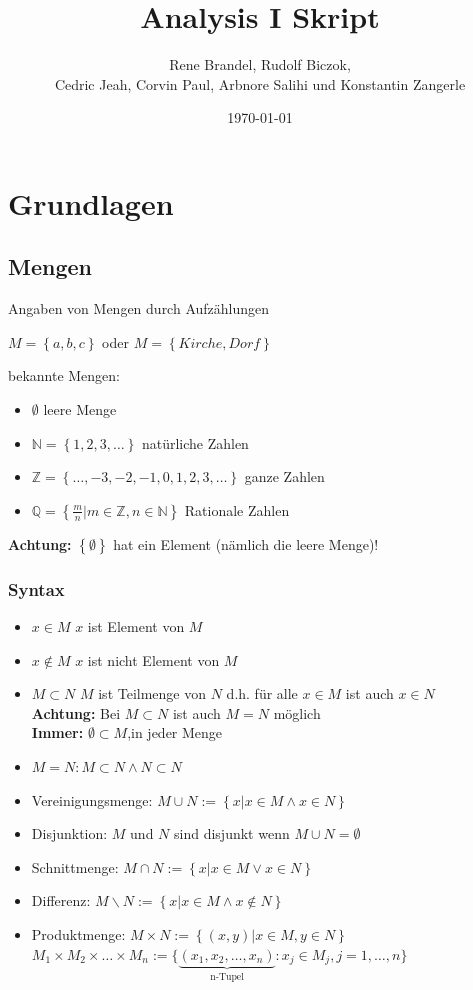 \documentclass[fleqn]{scrbook}
\newcommand{\titleText}{Analysis I Skript}
\newcommand{\mainAuthor}{Rene Brandel, Rudolf Biczok, \texorpdfstring{\\}{} Cedric Jeah, Corvin Paul, Arbnore Salihi und Konstantin Zangerle}
\newcommand{\N}{\mathbb{N}}
\begin{document}
\title{\titleText}
\date{\today}
\author{\mainAuthor}
\maketitle

\newpage
\tableofcontents
\newpage

\chapter{Grundlagen}
\section{Mengen}

Angaben von Mengen durch Aufzählungen

$M=\left\{ a,b,c \right\}$ oder $M=\left\{ Kirche, Dorf\right\}$

bekannte Mengen:
\begin{itemize}
  \item $\emptyset$ leere Menge
  \item $\N = \left\{ 1,2,3,\ldots \right\}$ natürliche Zahlen
  \item $\mathbb{Z} = \left\{ \ldots,-3,-2,-1,0,1,2,3,\ldots \right\}$ ganze Zahlen
  \item $\mathbb{Q} = \left\{ \frac{m}{n}|m \in \mathbb{Z},n \in \N \right\}$ Rationale Zahlen
\end{itemize}

\textbf{Achtung:} $\left\{ \emptyset \right\}$ hat ein Element (nämlich die leere Menge)!

\subsection{Syntax}
\begin{itemize}
  \item $x \in M$ $x$ ist Element von $M$
  \item $x \notin M$ $x$ ist nicht Element von $M$
  \item $M \subset N$ $M$ ist Teilmenge von $N$
  d.h. für alle $x \in M$ ist auch $x \in N$ \\
  \textbf{Achtung:} Bei $M \subset N $ ist auch $M = N$ möglich \\
  \textbf{Immer:} $\emptyset \subset M$,in jeder Menge
  \item $M=N: M \subset N \wedge N \subset N$
  \item Vereinigungsmenge: $M \cup N := \left\{ x|x \in M \wedge x \in N\right\}$
  \item Disjunktion: $M$ und $N$ sind disjunkt wenn $M  \cup N = \emptyset$ 
  \item Schnittmenge: $M \cap N := \left\{ x|x \in M \vee x \in N\right\}$ 
  \item Differenz: $M \backslash N := \left\{ x|x \in M \wedge x \notin N \right\}$ 
  \item Produktmenge: $M \times N:= \left\{ (x,y)|x \in M, y \in N \right\}$  \\
  $M_1 \times M_2 \times \ldots \times M_n := \{ \underbrace{(x_1,x_2,\ldots,x_n)}_{\text{n-Tupel}} : x_j \in M_j, j= 1,\ldots,n \}$
\end{itemize}
\end{document}
